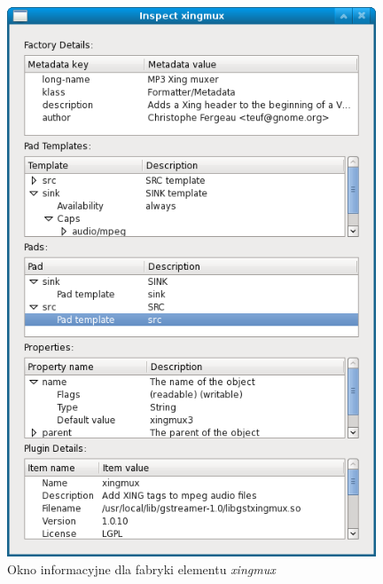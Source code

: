 \documentclass[12pt]{article}
\begin{document}
\begin{figure}[H]
  \includegraphics[width=110mm]{img/xingmux-factory-info-window.png}
  \caption{Okno informacyjne dla fabryki elementu \textit{xingmux}}
  \label{fig:xingmuxFactoryInfoWindow}
\end{figure}
\end{document}
